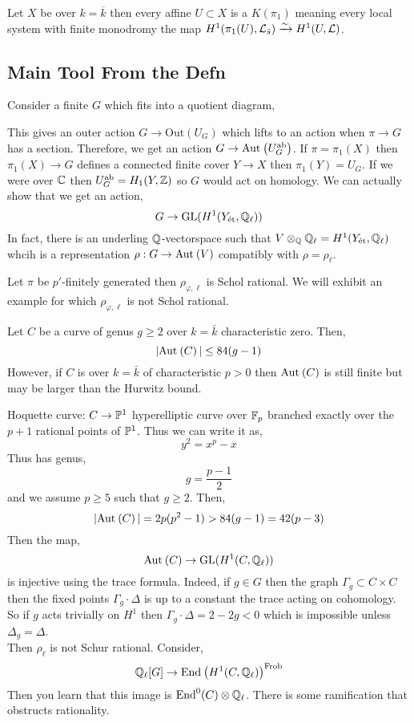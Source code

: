 \documentclass[12pt]{article}
\begin{document}
\begin{theorem}[Achinger]
Let $X$ be over $k = \overline{k}$ then every affine $U \subset X$ is a $K(\pi_1)$ meaning every local system with finite monodromy the map $H^1(\pi_1(U), \L_{\bar{s}}) \iso H^1(U, \L)$. 
\end{theorem}

\subsection{Main Tool From the Defn}

Consider a finite $G$ which fits into a quotient diagram,
\begin{center}
\end{center}
This gives an outer action $G \to \mathrm{Out}(U_G)$ which lifts to an action when $\pi \to G$ has a section. Therefore, we get an action $G \to \Aut{U_G^\ab}$. If $\pi = \pi_1(X)$ then $\pi_1(X) \to G$ defines a connected finite \etale cover $Y \to X$ then $\pi_1(Y) = U_G$. If we were over $\CC$ then $U_G^\ab = H_1(Y, \ZZ)$ so $G$ would act on homology. We can actually show that we get an action,
\[ G \to \GL(H^1(Y_\et, \Q_\ell)) \]
In fact, there is an underling $\Q$-vectorspace such that $V \ot_{\Q} \Q_{\ell} = H^1(Y_{\et}, \Q_\ell)$ whcih is a representation $\rho : G \to \Aut{V}$ compatibly with $\rho = \rho_\ell$. 

\begin{rmk}
Let $\pi$ be $p'$-finitely generated then $\rho_{\varphi, \ell}$ is Schol rational. We will exhibit an example for which $\rho_{\varphi, \ell}$ is not Schol rational.  
\end{rmk}

Let $C$ be a curve of genus $g \ge 2$ over $k = \bar{k}$ characteristic zero. Then,
\[ |\Aut{C}| \le 84(g - 1) \]
However, if $C$ is over $k = \bar{k}$ of characteristic $p > 0$ then $\Aut{C}$ is still finite but may be larger than the Hurwitz bound.

\begin{example}
Hoquette curve: $C \to \P^1$ hyperelliptic curve over $\FF_p$ branched exactly over the $p+1$ rational points of $\P^1$. Thus we can write it as,
\[ y^2 = x^p - x \]
Thus has genus,
\[ g = \frac{p-1}{2} \]
and we assume $p \ge 5$ such that $g \ge 2$. Then,
\[ |\Aut{C}| = 2p(p^2 - 1) > 84 (g - 1) = 42 (p - 3) \]
Then the map,
\[ \Aut{C} \to \GL(H^1(C, \Q_\ell)) \]
is injective using the trace formula. Indeed, if $g \in G$ then the graph $\Gamma_g \subset C \times C$ then the fixed points $\Gamma_g \cdot \Delta$ is up to a constant the trace acting on cohomology. So if $g$ acts trivially on $H^1$ then $\Gamma_g \cdot \Delta = 2 - 2 g < 0$ which is impossible unless $\Delta_g = \Delta$. 
\bigskip\\
Then $\rho_{\ell}$ is not Schur rational. Consider,
\[ \Q_{\ell}[G] \to \End{H^1(C, \Q_\ell)}^{\Frob} \]
Then you learn that this image is $\mathrm{End}^0(C) \ot \Q_{\ell}$. There is some ramification that obstructs rationality. 
\end{example}
\end{document}
